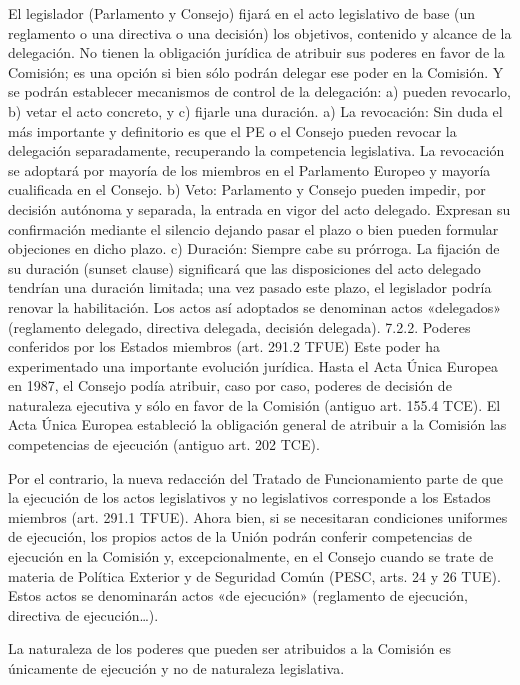 \documentclass[10pt,a4paper]{article}
\begin{document}
El legislador (Parlamento y Consejo) fijará en el acto legislativo de base (un reglamento o una directiva o una decisión) los objetivos, contenido y alcance de la delegación. No tienen la obligación jurídica de atribuir sus poderes en favor de la Comisión; es una opción si bien sólo podrán delegar ese poder en la Comisión. Y se podrán establecer mecanismos de control de la delegación: a) pueden revocarlo, b) vetar el acto concreto, y c) fijarle una duración.
a) La revocación: Sin duda el más importante y definitorio es que el PE o el Consejo pueden revocar la delegación separadamente, recuperando la competencia legislativa. La revocación se adoptará por mayoría de los miembros en el Parlamento Europeo y mayoría cualificada en el Consejo.
b) Veto: Parlamento y Consejo pueden impedir, por decisión autónoma y separada, la entrada en vigor del acto delegado. Expresan su confirmación mediante el silencio dejando pasar el plazo o bien pueden formular objeciones en dicho plazo.
c) Duración: Siempre cabe su prórroga. La fijación de su duración
(sunset clause) significará que las disposiciones del acto delegado
tendrían una duración limitada; una vez pasado este plazo, el
legislador podría renovar la habilitación.
Los actos así adoptados se denominan actos «delegados»
(reglamento delegado, directiva delegada, decisión delegada).
7.2.2. Poderes conferidos por los Estados miembros (art. 291.2
TFUE)
Este poder ha experimentado una importante evolución jurídica. Hasta el Acta Única Europea en 1987, el Consejo podía atribuir, caso por caso, poderes de decisión de naturaleza ejecutiva y sólo en favor de la Comisión (antiguo art. 155.4 TCE). El Acta Única Europea estableció la obligación general de atribuir a la Comisión las competencias de ejecución (antiguo art. 202 TCE).

Por el contrario, la nueva redacción del Tratado de Funcionamiento parte de que la ejecución de los actos legislativos y no legislativos corresponde a los Estados miembros (art. 291.1 TFUE). Ahora bien, si se necesitaran condiciones uniformes de ejecución, los propios actos de la Unión podrán conferir competencias de ejecución en la Comisión y, excepcionalmente, en el Consejo cuando se trate de materia de Política Exterior y de Seguridad Común (PESC, arts. 24 y 26 TUE). Estos actos se denominarán actos «de ejecución» (reglamento de ejecución, directiva de ejecución…).

La naturaleza de los poderes que pueden ser atribuidos a la Comisión es únicamente de ejecución y no de naturaleza legislativa.
\end{document}
